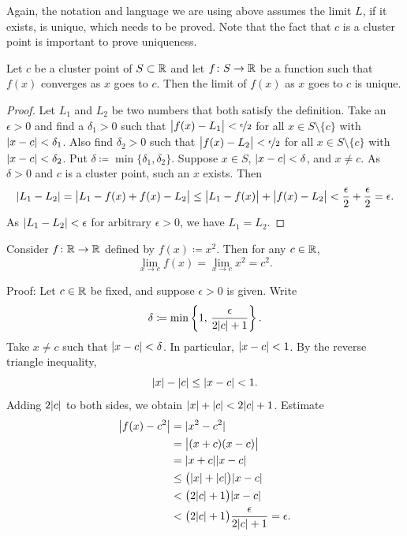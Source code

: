 Again, the notation and language we are using above assumes the limit $L$, if
it exists, is unique, which needs to be proved.  Note that the fact that $c$
is a cluster point is important to prove uniqueness.

\begin{prop}
Let $c$ be a cluster point of $S \subset {\mathbb{R}}$ and let $f \colon S \to {\mathbb{R}}$
be a function such that $f(x)$ converges as $x$ goes to $c$.  Then
the limit of $f(x)$ as $x$ goes to $c$ is unique.
\end{prop}

\begin{proof}
Let $L_1$ and $L_2$ be two numbers that both satisfy the definition.
Take an $\epsilon > 0$ and find a $\delta_1 > 0$ such that
$\bigl\lvert {f(x)-L_1} \bigr\rvert < \nicefrac{\epsilon}{2}$ 
for all $x \in S \setminus \{c\}$ with $\lvert {x-c} \rvert < \delta_1$.
Also find $\delta_2 > 0$ such that
$\bigl\lvert {f(x)-L_2} \bigr\rvert < \nicefrac{\epsilon}{2}$
for all $x \in S \setminus \{c\}$ with $\lvert {x-c} \rvert < \delta_2$.
Put $\delta \coloneqq \min \{ \delta_1, \delta_2 \}$.  Suppose $x \in S$,
$\lvert {x-c} \rvert < \delta$, and $x \neq c$.  As $\delta > 0$ and $c$ is a cluster
point, such an $x$ exists.  Then
\begin{equation*}
\lvert {L_1 - L_2} \rvert =
\bigl\lvert {L_1 - f(x) + f(x) - L_2} \bigr\rvert \leq
\bigl\lvert {L_1 - f(x)} \bigr\rvert + \bigl\lvert {f(x) - L_2} \bigr\rvert < \frac{\epsilon}{2} + \frac{\epsilon}{2}
= \epsilon.
\end{equation*}
As $\lvert {L_1-L_2} \rvert < \epsilon$ for arbitrary $\epsilon > 0$, we have
$L_1 = L_2$.
\end{proof}

\begin{example}
Consider $f \colon {\mathbb{R}} \to {\mathbb{R}}$ defined by $f(x) \coloneqq x^2$.  Then
for any $c \in {\mathbb{R}}$,
\begin{equation*}
\lim_{x\to c} f(x) = \lim_{x\to c} x^2 = c^2 .
\end{equation*}

Proof: Let $c \in {\mathbb{R}}$ be fixed, and suppose $\epsilon > 0$ is given.  Write
\begin{equation*}
\delta \coloneqq \min \left\{ 1 , \, \frac{\epsilon}{2\lvert {c} \rvert+1} \right\} .
\end{equation*}
Take $x \neq c$ such that $\lvert {x-c} \rvert < \delta$.  In particular,
$\lvert {x-c} \rvert < 1$.  By the reverse triangle inequality,
\begin{equation*}
\lvert {x} \rvert-\lvert {c} \rvert \leq \lvert {x-c} \rvert < 1 .
\end{equation*}
Adding $2\lvert {c} \rvert$ to both sides, we obtain
$\lvert {x} \rvert + \lvert {c} \rvert < 2\lvert {c} \rvert + 1$.  Estimate
\begin{equation*}
\begin{split}
\bigl\lvert {f(x) - c^2} \bigr\rvert &= \lvert {x^2-c^2} \rvert \\
&= \bigl\lvert {(x+c)(x-c)} \bigr\rvert \\
&= \lvert {x+c} \rvert\lvert {x-c} \rvert \\
&\leq \bigl(\lvert {x} \rvert+\lvert {c} \rvert\bigr)\lvert {x-c} \rvert \\
&< \bigl(2\lvert {c} \rvert+1\bigr)\lvert {x-c} \rvert \\
&< \bigl(2\lvert {c} \rvert+1\bigr)\frac{\epsilon}{2\lvert {c} \rvert+1} = \epsilon .
\end{split}
\end{equation*}
\end{example}

